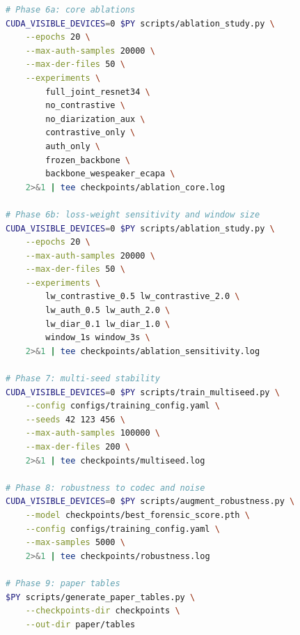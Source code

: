 \documentclass{article}
\begin{document}
\begin{lstlisting}[language=bash,caption={Phases 6--9: extended experiments and paper tables.}]
# Phase 6a: core ablations
CUDA_VISIBLE_DEVICES=0 $PY scripts/ablation_study.py \
    --epochs 20 \
    --max-auth-samples 20000 \
    --max-der-files 50 \
    --experiments \
        full_joint_resnet34 \
        no_contrastive \
        no_diarization_aux \
        contrastive_only \
        auth_only \
        frozen_backbone \
        backbone_wespeaker_ecapa \
    2>&1 | tee checkpoints/ablation_core.log

# Phase 6b: loss-weight sensitivity and window size
CUDA_VISIBLE_DEVICES=0 $PY scripts/ablation_study.py \
    --epochs 20 \
    --max-auth-samples 20000 \
    --max-der-files 50 \
    --experiments \
        lw_contrastive_0.5 lw_contrastive_2.0 \
        lw_auth_0.5 lw_auth_2.0 \
        lw_diar_0.1 lw_diar_1.0 \
        window_1s window_3s \
    2>&1 | tee checkpoints/ablation_sensitivity.log

# Phase 7: multi-seed stability
CUDA_VISIBLE_DEVICES=0 $PY scripts/train_multiseed.py \
    --config configs/training_config.yaml \
    --seeds 42 123 456 \
    --max-auth-samples 100000 \
    --max-der-files 200 \
    2>&1 | tee checkpoints/multiseed.log

# Phase 8: robustness to codec and noise
CUDA_VISIBLE_DEVICES=0 $PY scripts/augment_robustness.py \
    --model checkpoints/best_forensic_score.pth \
    --config configs/training_config.yaml \
    --max-samples 5000 \
    2>&1 | tee checkpoints/robustness.log

# Phase 9: paper tables
$PY scripts/generate_paper_tables.py \
    --checkpoints-dir checkpoints \
    --out-dir paper/tables
\end{lstlisting}

\newpage

\end{document}

